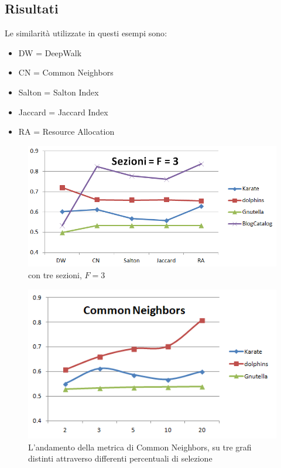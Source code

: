 \subsection{Risultati}
Le similarità utilizzate in questi esempi sono\cite{all_metric}:
\begin{itemize}
	\item DW = DeepWalk
	\item CN = Common Neighbors\cite{CN_metric}
	\item Salton = Salton Index\cite{Salton_metric}
	\item Jaccard = Jaccard Index
	\item RA = Resource Allocation\cite{RA_metric}
\end{itemize}
%
\begin{figure}[htp]
	\centering
	\includegraphics[width=\linewidth]{immagini/LP_fold3}
	\caption{\LPred con tre sezioni, $F=3$}
	\label{fig:LP_fold3}
\end{figure}
%
\begin{figure}[htp]
	\centering
	\includegraphics[width=\linewidth]{immagini/LP_CN}
	\caption{L'andamento della metrica di Common Neighbors, su tre grafi distinti attraverso differenti percentuali di selezione}
	\label{fig:LP_CN}
\end{figure}
